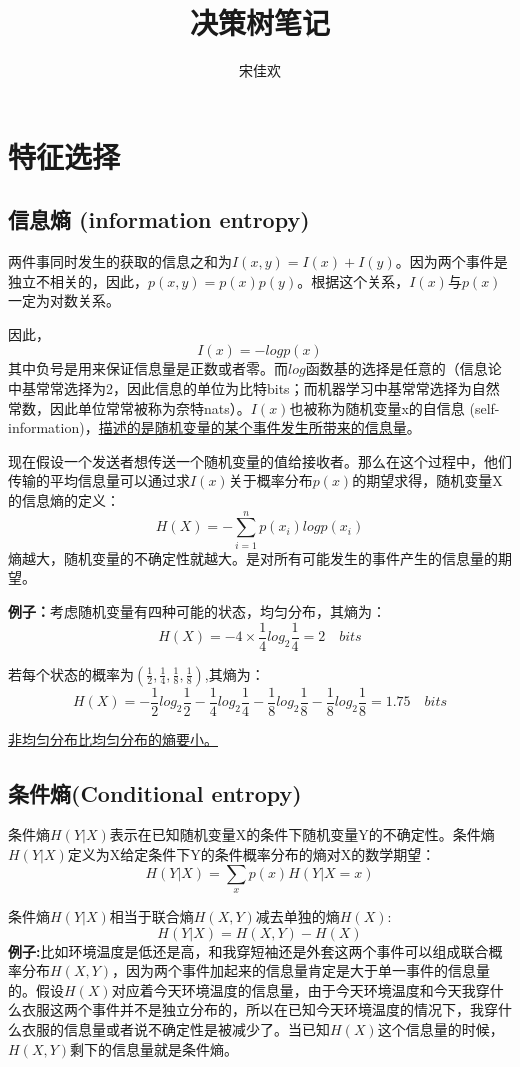 \documentclass[UTF8]{ctexart} %
\title{决策树笔记}
\author{宋佳欢}
\begin{document}
	\maketitle
	\tableofcontents
	\songti {}
	
	\section{特征选择}
		\subsection{信息熵 (information entropy)}
			两件事同时发生的获取的信息之和为$I(x,y)=I(x)+I(y)$。因为两个事件是独立不相关的，因此，$p(x,y)=p(x)p(y)$。根据这个关系，$I(x)$与$p(x)$一定为对数关系。
			
			因此，\[I(x)=-logp(x)\]
			其中负号是用来保证信息量是正数或者零。而$log$函数基的选择是任意的（信息论中基常常选择为2，因此信息的单位为比特bits；而机器学习中基常常选择为自然常数，因此单位常常被称为奈特nats）。$I(x)$也被称为随机变量x的自信息 (self-information)，\uline{描述的是随机变量的某个事件发生所带来的信息量}。
			
			现在假设一个发送者想传送一个随机变量的值给接收者。那么在这个过程中，他们传输的平均信息量可以通过求$I(x)$关于概率分布$p(x)$的期望求得，随机变量X的信息熵的定义：
			\[H(X)= -\sum_{i=1}^np(x_i)logp(x_i)\]
			熵越大，随机变量的不确定性就越大。是对所有可能发生的事件产生的信息量的期望。
			
			\textbf{例子：}考虑随机变量有四种可能的状态，均匀分布，其熵为：
			\[H(X)=-4\times\frac{1}{4}log_2\frac{1}{4}=2\quad bits\]
			
			若每个状态的概率为$(\frac{1}{2},\frac{1}{4},\frac{1}{8},\frac{1}{8})$,其熵为：
			\[H(X)=-\frac{1}{2}log_2\frac{1}{2}-\frac{1}{4}log_2\frac{1}{4}-\frac{1}{8}log_2\frac{1}{8}-\frac{1}{8}log_2\frac{1}{8}=1.75\quad bits\]
			
			\uline{非均匀分布比均匀分布的熵要小。}
		\subsection{条件熵(Conditional entropy)}
			条件熵$H(Y|X)$表示在已知随机变量X的条件下随机变量Y的不确定性。条件熵$H(Y|X)$定义为X给定条件下Y的条件概率分布的熵对X的数学期望：
			\[H(Y|X)=\sum_xp(x)H(Y|X=x)\]
			
			条件熵$H(Y|X)$相当于联合熵$H(X,Y)$减去单独的熵$H(X)$:
			\[H(Y|X)=H(X,Y)-H(X)\]
			\textbf{例子:}比如环境温度是低还是高，和我穿短袖还是外套这两个事件可以组成联合概率分布$H(X,Y)$，因为两个事件加起来的信息量肯定是大于单一事件的信息量的。假设$H(X)$对应着今天环境温度的信息量，由于今天环境温度和今天我穿什么衣服这两个事件并不是独立分布的，所以在已知今天环境温度的情况下，我穿什么衣服的信息量或者说不确定性是被减少了。当已知$H(X)$这个信息量的时候，$H(X,Y)$剩下的信息量就是条件熵。
			
\end{document}
